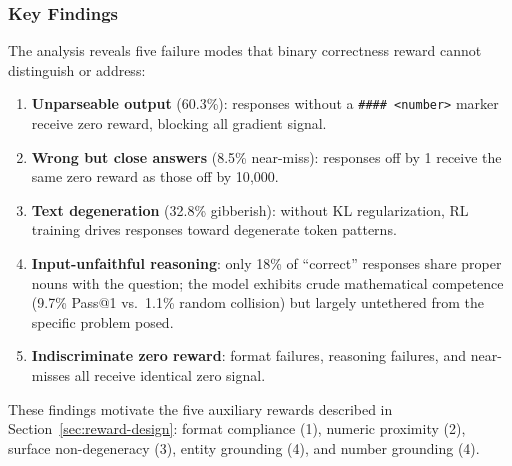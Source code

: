 \nestunindent
\subsubsection{Key Findings}
\nestindent

The analysis reveals five failure modes that binary correctness reward cannot distinguish or address:
\begin{enumerate}[nosep]
    \item \textbf{Unparseable output} (60.3\%): responses without a \texttt{\#\#\#\# <number>} marker receive zero reward, blocking all gradient signal.
    \item \textbf{Wrong but close answers} (8.5\% near-miss): responses off by 1 receive the same zero reward as those off by 10{,}000.
    \item \textbf{Text degeneration} (32.8\% gibberish): without KL regularization, RL training drives responses toward degenerate token patterns.
    \item \textbf{Input-unfaithful reasoning}: only 18\% of ``correct'' responses share proper nouns with the question; the model exhibits crude mathematical competence (9.7\% Pass@1 vs.\ 1.1\% random collision) but largely untethered from the specific problem posed.
    \item \textbf{Indiscriminate zero reward}: format failures, reasoning failures, and near-misses all receive identical zero signal.
\end{enumerate}
These findings motivate the five auxiliary rewards described in Section~\ref{sec:reward-design}: format compliance (1), numeric proximity (2), surface non-degeneracy (3), entity grounding (4), and number grounding (4).

\nestunindent
\nestunindent
